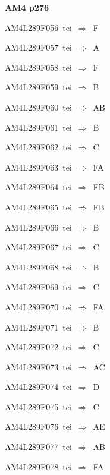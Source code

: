 \par\vfill\eject
{\bf\hfill AM4 p276\hfill\hbox{}}\par\bigskip
{\sixrm AM4L289F056\ {\sixit tei}\ }$\Rightarrow$\ F\par\smallskip
{\sixrm AM4L289F057\ {\sixit tei}\ }$\Rightarrow$\ A\par\smallskip
{\sixrm AM4L289F058\ {\sixit tei}\ }$\Rightarrow$\ F\par\smallskip
{\sixrm AM4L289F059\ {\sixit tei}\ }$\Rightarrow$\ B\par\smallskip
{\sixrm AM4L289F060\ {\sixit tei}\ }$\Rightarrow$\ AB\par\smallskip
{\sixrm AM4L289F061\ {\sixit tei}\ }$\Rightarrow$\ B\par\smallskip
{\sixrm AM4L289F062\ {\sixit tei}\ }$\Rightarrow$\ C\par\smallskip
{\sixrm AM4L289F063\ {\sixit tei}\ }$\Rightarrow$\ FA\par\smallskip
{\sixrm AM4L289F064\ {\sixit tei}\ }$\Rightarrow$\ FB\par\smallskip
{\sixrm AM4L289F065\ {\sixit tei}\ }$\Rightarrow$\ FB\par\smallskip
{\sixrm AM4L289F066\ {\sixit tei}\ }$\Rightarrow$\ B\par\smallskip
{\sixrm AM4L289F067\ {\sixit tei}\ }$\Rightarrow$\ C\par\smallskip
{\sixrm AM4L289F068\ {\sixit tei}\ }$\Rightarrow$\ B\par\smallskip
{\sixrm AM4L289F069\ {\sixit tei}\ }$\Rightarrow$\ C\par\smallskip
{\sixrm AM4L289F070\ {\sixit tei}\ }$\Rightarrow$\ FA\par\smallskip
{\sixrm AM4L289F071\ {\sixit tei}\ }$\Rightarrow$\ B\par\smallskip
{\sixrm AM4L289F072\ {\sixit tei}\ }$\Rightarrow$\ C\par\smallskip
{\sixrm AM4L289F073\ {\sixit tei}\ }$\Rightarrow$\ AC\par\smallskip
{\sixrm AM4L289F074\ {\sixit tei}\ }$\Rightarrow$\ D\par\smallskip
{\sixrm AM4L289F075\ {\sixit tei}\ }$\Rightarrow$\ C\par\smallskip
{\sixrm AM4L289F076\ {\sixit tei}\ }$\Rightarrow$\ AE\par\smallskip
{\sixrm AM4L289F077\ {\sixit tei}\ }$\Rightarrow$\ AB\par\smallskip
{\sixrm AM4L289F078\ {\sixit tei}\ }$\Rightarrow$\ FA\par\smallskip
